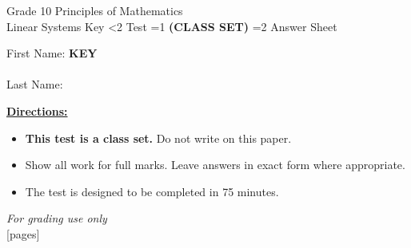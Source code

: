 \documentclass[addpoints]{exam}
\newcommand{\event}{Linear Systems}
\newcommand{\tournament}{}
\def\type{0}
\begin{document}
\begin{center}
    {\huge Grade 10 Principles of Mathematics \\ \event
    \ifprintanswers \space Key
    \else \space \ifnum\type<2 Test \fi \ifnum\type=1 \textbf{(CLASS SET)} \fi
          \ifnum\type=2 Answer Sheet \fi
    \fi \\ \vspace{3mm}\tournament\vspace{1mm}}
\end{center}

\vspace{.25\textheight}

\begin{center}
    First Name: \ifprintanswers
    \underline{\hspace{3.5cm}}\textbf{KEY}\underline{\hspace{5.5cm}}\\\ \vspace{5mm}
    \else \underline{\hspace{10cm}}\\ \vspace{5mm} \fi
    Last Name: \underline{\hspace{10cm}}\\ \vspace{5mm}
\end{center}

\noindent\textbf{\underline{Directions:}}
\begin{itemize}
    \ifnum\type=1 \item \textbf{This test is a class set.} Do not write on this paper. \fi
    \item Show all work for full marks. Leave answers in exact form where appropriate.
    \item The test is designed to be completed in 75 minutes.
\end{itemize}
\begin{center}
\textit{For grading use only}\\
[pages]
\end{center}
\end{document}

